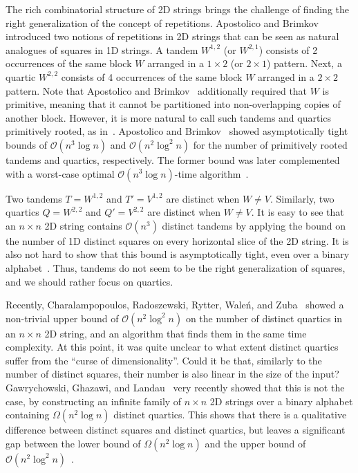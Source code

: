 \documentclass[11pt,letterpaper]{article}
\newcommand{\cO}{\mathcal{O}}
\begin{document}
The rich combinatorial structure of 2D strings brings the challenge of finding the right generalization
of the concept of repetitions.
Apostolico and Brimkov~\cite{AB} introduced two notions of repetitions in 2D strings that can be seen
as natural analogues of squares in 1D strings. A tandem $W^{1,2}$ (or $W^{2,1}$) consists of 2 occurrences of the same block
$W$ arranged in a $1\times 2$ (or $2\times 1$) pattern. Next, a quartic $W^{2,2}$ consists of 4 occurrences of the
same block $W$ arranged in a $2\times 2$ pattern. Note that Apostolico and Brimkov~\cite{AB} additionally
required that $W$ is primitive, meaning that it cannot be partitioned into non-overlapping copies
of another block. However, it is more natural to call such tandems and quartics primitively rooted,
as in~\cite{CRRWZ}.
Apostolico and Brimkov~\cite{AB} showed asymptotically tight bounds of $\cO(n^{3}\log n)$ and $\cO(n^{2}\log^{2}n)$ for the number of primitively rooted tandems and quartics, respectively.
The former bound was later complemented with a worst-case optimal $\cO(n^{3}\log n)$-time
algorithm~\cite{DBLP:journals/dam/ApostolicoB05}.

Two tandems $T=W^{1,2}$ and $T'=V^{1,2}$ are distinct when $W\neq V$. 
Similarly,
two quartics $Q=W^{2,2}$ and $Q'=V^{2,2}$ are distinct when $W\neq V$.
It is easy to see that an $n\times n$ 2D string contains $\cO(n^{3})$ distinct tandems by applying the bound on the number of 1D distinct squares on every horizontal slice of the 2D string. It is also not hard to show that this bound is asymptotically
tight, even over a binary alphabet~\cite{GGL}. Thus, tandems do not seem to be the right generalization of squares,
and we should rather focus on quartics.

Recently, Charalampopoulos, Radoszewski, Rytter, Waleń, and Zuba~\cite{CRRWZ}
showed a non-trivial upper bound of $\cO(n^{2}\log^{2}n)$ on the number of distinct quartics in an $n\times n$ 2D string,
and an algorithm that finds them in the same time complexity.
At this point, it was quite unclear to what extent distinct quartics suffer from the
``curse of dimensionality''. Could it be that, similarly to the number of distinct squares, their number is also linear in the size of the
input? Gawrychowski, Ghazawi, and Landau~\cite{GGL} very recently showed that this is not the case,
by constructing an infinite family of $n\times n$ 2D strings over a binary alphabet containing $\Omega(n^{2}\log n)$
distinct quartics. This shows that there is a qualitative difference between distinct squares and distinct quartics,
but leaves a significant gap between the lower bound of $\Omega(n^{2}\log n)$ and the upper bound of
$\cO(n^{2}\log^{2}n)$~\cite{CRRWZ}.
\end{document}
